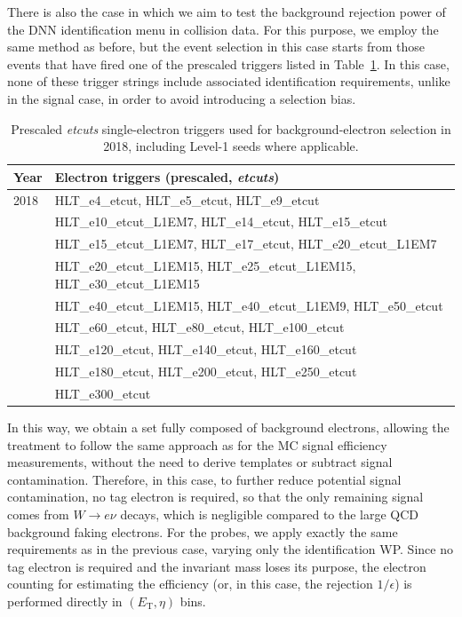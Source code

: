 There is also the case in which we aim to test the background rejection power of the DNN identification menu in collision data.  
For this purpose, we employ the same method as before, but the event selection in this case starts from those events that have fired one of the prescaled triggers listed in Table~\ref{tab:electron_triggers_prescaled_2018}.  
In this case, none of these trigger strings include associated identification requirements, unlike in the signal case, in order to avoid introducing a selection bias.

\begin{table}[htbp]
  \centering
  \scriptsize
  \begin{tabular}{ll}
    \toprule
    \textbf{Year} & \textbf{Electron triggers (prescaled, \textit{etcuts})} \\
    \midrule
    2018 &
    HLT\_e4\_etcut, HLT\_e5\_etcut, HLT\_e9\_etcut \\
    & HLT\_e10\_etcut\_L1EM7, HLT\_e14\_etcut, HLT\_e15\_etcut \\
    & HLT\_e15\_etcut\_L1EM7, HLT\_e17\_etcut, HLT\_e20\_etcut\_L1EM7 \\
    & HLT\_e20\_etcut\_L1EM15, HLT\_e25\_etcut\_L1EM15, HLT\_e30\_etcut\_L1EM15 \\
    & HLT\_e40\_etcut\_L1EM15, HLT\_e40\_etcut\_L1EM9, HLT\_e50\_etcut \\
    & HLT\_e60\_etcut, HLT\_e80\_etcut, HLT\_e100\_etcut \\
    & HLT\_e120\_etcut, HLT\_e140\_etcut, HLT\_e160\_etcut \\
    & HLT\_e180\_etcut, HLT\_e200\_etcut, HLT\_e250\_etcut \\
    & HLT\_e300\_etcut \\
    \bottomrule
  \end{tabular}
  \caption{Prescaled \textit{etcuts} single-electron triggers used for background-electron selection in 2018, including Level-1 seeds where applicable.}
  \label{tab:electron_triggers_prescaled_2018}
\end{table}

In this way, we obtain a set fully composed of background electrons, allowing the treatment to follow the same approach as for the MC signal efficiency measurements, without the need to derive templates or subtract signal contamination.  
Therefore, in this case, to further reduce potential signal contamination, no tag electron is required, so that the only remaining signal comes from $W \to e\nu$ decays, which is negligible compared to the large QCD background faking electrons.  
For the probes, we apply exactly the same requirements as in the previous case, varying only the identification WP.  
Since no tag electron is required and the invariant mass loses its purpose, the electron counting for estimating the efficiency (or, in this case, the rejection $1/\epsilon$) is performed directly in $(E_{\text{T}},\eta)$ bins.


